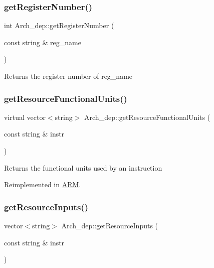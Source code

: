 \mbox{\label{classArch__dep_adb2c2145f6abeb415436bbe3d622cf70}} 
\subsubsection{\texorpdfstring{get\+Register\+Number()}{getRegisterNumber()}}
{\footnotesize\ttfamily int Arch\+\_\+dep\+::get\+Register\+Number (\begin{DoxyParamCaption}\item[{const string \&}]{reg\+\_\+name }\end{DoxyParamCaption})}

Returns the register number of reg\+\_\+name \mbox{\label{classArch__dep_a6aa967ba3a9e3cf2954cc376c6ce6a06}} 
\subsubsection{\texorpdfstring{get\+Resource\+Functional\+Units()}{getResourceFunctionalUnits()}}
{\footnotesize\ttfamily virtual vector$<$string$>$ Arch\+\_\+dep\+::get\+Resource\+Functional\+Units (\begin{DoxyParamCaption}\item[{const string \&}]{instr }\end{DoxyParamCaption})\hspace{0.3cm}{\ttfamily [virtual]}}

Returns the functional units used by an instruction 

Reimplemented in \hyperlink{classARM_a1fa177cc34bbe368167488311b7ab5e5}{A\+RM}.

\mbox{\label{classArch__dep_a62ba8da6b630eaffc886affddb769a55}} 
\subsubsection{\texorpdfstring{get\+Resource\+Inputs()}{getResourceInputs()}}
{\footnotesize\ttfamily vector$<$string$>$ Arch\+\_\+dep\+::get\+Resource\+Inputs (\begin{DoxyParamCaption}\item[{const string \&}]{instr }\end{DoxyParamCaption})}


